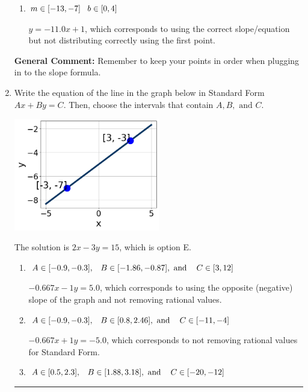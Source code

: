 \documentclass{extbook}[14pt]
\newcommand{\litem}[1]{\item #1

\rule{\textwidth}{0.4pt}}
\begin{document}
\begin{enumerate}
{\begin{enumerate}[label=\Alph*.]
* $y = -11.0x -107.0$, which is the correct option.
\item \( m \in [-13, -7] \hspace*{3mm} b \in [0, 4] \)

 $y = -11.0x + 1$, which corresponds to using the correct slope/equation but not distributing correctly using the first point.
\end{enumerate}

\textbf{General Comment:} Remember to keep your points in order when plugging in to the slope formula.
}
\litem{
Write the equation of the line in the graph below in Standard Form $Ax+By=C$. Then, choose the intervals that contain $A, B, \text{ and } C$.

\begin{center}
    \includegraphics[width=0.5\textwidth]{../Figures/linearGraphToStandardB.png}
\end{center}


The solution is \( 2x - 3y = 15 \), which is option E.\begin{enumerate}[label=\Alph*.]
\item \( A \in [-0.9, -0.3], \hspace{3mm} B \in [-1.86, -0.87], \text{ and } \hspace{3mm} C \in [3, 12] \)

 $-0.667x - 1y = 5.0$, which corresponds to using the opposite (negative) slope of the graph and not removing rational values.
\item \( A \in [-0.9, -0.3], \hspace{3mm} B \in [0.8, 2.46], \text{ and } \hspace{3mm} C \in [-11, -4] \)

 $-0.667x + 1y = -5.0$, which corresponds to not removing rational values for Standard Form.
\item \( A \in [0.5, 2.3], \hspace{3mm} B \in [1.88, 3.18], \text{ and } \hspace{3mm} C \in [-20, -12] \)


\end{enumerate}}
\end{enumerate}
\end{document}

